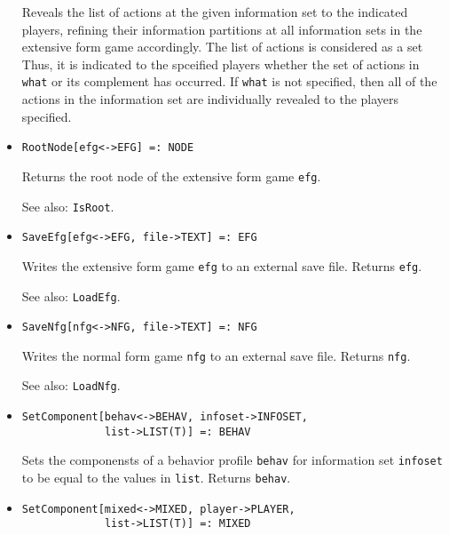 \begin{itemize}
\bd
Reveals the list of actions at the given information
set to the indicated players, refining their information partitions at
all information sets in the extensive form game accordingly.  The list
of actions is considered as a set Thus, it is indicated to the
spceified players whether the set of actions in \verb+what+ or its
complement has occurred.  If \verb+what+ is not specified, then all of
the actions in the information set are individually revealed to
the players specified.  
\ed


\item
\protect \large \begin{verbatim}
RootNode[efg<->EFG] =: NODE
\end{verbatim}\normalsize

\bd
Returns the root node of the extensive form game \verb+efg+.
\item
[See also:] {\tt IsRoot}.
\ed


\item
\protect \large \begin{verbatim}
SaveEfg[efg<->EFG, file->TEXT] =: EFG
\end{verbatim}\normalsize

\bd
Writes the extensive form game \verb+efg+ to an external
save file.  Returns \verb+efg+.
\item
[See also:] {\tt LoadEfg}.
\ed

\item
\protect \large \begin{verbatim}
SaveNfg[nfg<->NFG, file->TEXT] =: NFG
\end{verbatim}\normalsize

\bd
Writes the normal form game \verb+nfg+ to an external
save file.  Returns \verb+nfg+.
\item
[See also:] {\tt LoadNfg}.
\ed

\item
\protect \large \begin{verbatim} 
SetComponent[behav<->BEHAV, infoset->INFOSET, 
             list->LIST(T)] =: BEHAV 
\end{verbatim}\normalsize

\bd
Sets the componensts of a behavior profile \verb+behav+ for
information set \verb+infoset+ to be equal to the values in \verb+list+.
Returns \verb+behav+. 
\ed

\item
\protect \large \begin{verbatim} 
SetComponent[mixed<->MIXED, player->PLAYER, 
             list->LIST(T)] =: MIXED 
\end{verbatim}\normalsize


\end{itemize}
